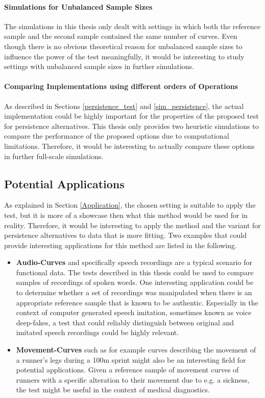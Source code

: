 \documentclass[12pt, a4paper]{article}
\theoremstyle{MAstyle} \newtheorem{assumption}{Assumption}[section]
\theoremstyle{MAstyle} \newtheorem{definition}{Definition}[section]
\theoremstyle{MAstyle} \newtheorem{theorem}{Theorem}[section]
\begin{document}
			\paragraph{Simulations for Unbalanced Sample Sizes\\}
			The simulations in this thesis only dealt with settings in which both the reference sample and the second sample contained the same number of curves. Even though there is no obvious theoretical reason for unbalanced sample sizes to influence the power of the test meaningfully, it would be interesting to study settings with unbalanced sample sizes in further simulations.		
			
			\paragraph{Comparing Implementations using different orders of Operations\\}
			As described in Sections \ref{persistence_test} and \ref{sim_persistence}, the actual implementation could be highly important for the properties of the proposed test for persistence alternatives. This thesis only provides two heuristic simulations to compare the performance of the proposed options due to computational limitations. Therefore, it would be interesting to actually compare these options in further full-scale simulations.
		
		\subsection{Potential Applications}\label{pot_appl}
			As explained in Section \ref{Application}, the chosen setting is suitable to apply the test, but it is more of a showcase then what this method would be used for in reality. Therefore, it would be interesting to apply the method and the variant for persistence alternatives to data that is more fitting. Two examples that could provide interesting applications for this method are listed in the following.
			\begin{itemize}
				\item \textbf{Audio-Curves} and specifically speech recordings are a typical scenario for functional data. The tests described in this thesis could be used to compare samples of recordings of spoken words. One interesting application could be to determine whether a set of recordings was manipulated when there is an appropriate reference sample that is known to be authentic. Especially in the context of computer generated speech imitation, sometimes known as voice deep-fakes, a test that could reliably distinguish between original and imitated speech recordings could be highly relevant.
				\item \textbf{Movement-Curves} such as for example curves describing the movement of a runner's legs during a 100m sprint might also be an interesting field for potential applications. Given a reference sample of movement curves of runners with a specific alteration to their movement due to e.g. a sickness, the test might be useful in the context of medical diagnostics.
			\end{itemize}
		
\end{document}
